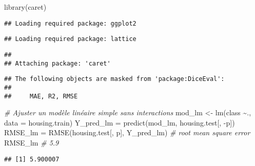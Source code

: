 \documentclass[
]{article}
\newenvironment{Shaded}{\begin{snugshade}}{\end{snugshade}}
\newcommand{\AttributeTok}[1]{\textcolor[rgb]{0.77,0.63,0.00}{#1}}
\newcommand{\CommentTok}[1]{\textcolor[rgb]{0.56,0.35,0.01}{\textit{#1}}}
\newcommand{\DecValTok}[1]{\textcolor[rgb]{0.00,0.00,0.81}{#1}}
\newcommand{\FunctionTok}[1]{\textcolor[rgb]{0.00,0.00,0.00}{#1}}
\newcommand{\NormalTok}[1]{#1}
\newcommand{\OtherTok}[1]{\textcolor[rgb]{0.56,0.35,0.01}{#1}}
\newcommand{\SpecialCharTok}[1]{\textcolor[rgb]{0.00,0.00,0.00}{#1}}
\begin{document}
\begin{Shaded}
\begin{Highlighting}[]
\FunctionTok{library}\NormalTok{(caret)}
\end{Highlighting}
\end{Shaded}

\begin{verbatim}
## Loading required package: ggplot2
\end{verbatim}

\begin{verbatim}
## Loading required package: lattice
\end{verbatim}

\begin{verbatim}
## 
## Attaching package: 'caret'
\end{verbatim}

\begin{verbatim}
## The following objects are masked from 'package:DiceEval':
## 
##     MAE, R2, RMSE
\end{verbatim}

\begin{Shaded}
\begin{Highlighting}[]
\CommentTok{\# Ajuster un modèle linéaire simple sans interactions}
\NormalTok{mod\_lm }\OtherTok{\textless{}{-}} \FunctionTok{lm}\NormalTok{(class }\SpecialCharTok{\textasciitilde{}}\NormalTok{., }\AttributeTok{data =}\NormalTok{ housing.train)}
\NormalTok{Y\_pred\_lm }\OtherTok{=} \FunctionTok{predict}\NormalTok{(mod\_lm, housing.test[, }\SpecialCharTok{{-}}\NormalTok{p])}
\NormalTok{RMSE\_lm }\OtherTok{=} \FunctionTok{RMSE}\NormalTok{(housing.test[, p], Y\_pred\_lm)  }\CommentTok{\# root mean square error}
\NormalTok{RMSE\_lm }\CommentTok{\# 5.9}
\end{Highlighting}
\end{Shaded}

\begin{verbatim}
## [1] 5.900007
\end{verbatim}

\begin{Shaded}
\end{Shaded}
\end{document}

